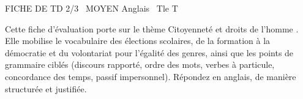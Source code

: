 \documentclass[11pt]{article}
\begin{document}
\begin{tcolorbox}[enhanced,colback=popink,colframe=popink,arc=10pt,boxrule=0pt,left=12pt,right=12pt,top=9pt,bottom=9pt]
{\color{white}\popxbold\small FICHE DE TD 2/3 \textbullet\ MOYEN \hfill Anglais \textbullet\ Tle T\par}
\end{tcolorbox}
\vspace{4pt}
\noindent Cette fiche d'évaluation porte sur le thème \og Citoyenneté et droits de l'homme \fg{}. Elle mobilise le vocabulaire des élections scolaires, de la formation à la démocratie et du volontariat pour l'égalité des genres, ainsi que les points de grammaire ciblés (discours rapporté, ordre des mots, verbes à particule, concordance des temps, passif impersonnel). Répondez en anglais, de manière structurée et justifiée.
\end{document}
